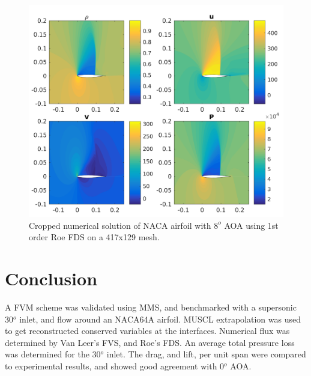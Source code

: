 \documentclass[]{aiaa-tc}%
\begin{document}
\begin{figure}[!htb]
  \centering
  \includegraphics[width=0.75\linewidth]{figures/NACA_mesh4_A8_Soln}
  \caption{Cropped numerical solution of NACA airfoil with $8^o$ AOA using 1st order Roe FDS on a 417x129 mesh.}
  \label{fig:naca8AO}
\end{figure}

\section{Conclusion}

A FVM scheme was validated using MMS, and benchmarked with a supersonic 30$^o$ inlet, and flow around an NACA64A airfoil. MUSCL extrapolation was used to get reconstructed conserved variables at the interfaces. Numerical flux was determined by Van Leer's FVS, and Roe's FDS. An average total pressure loss was determined for the 30$^o$ inlet. The drag, and lift, per unit span were compared to experimental results, and showed good agreement with 0$^o$ AOA. 

\pagebreak


\end{document}
